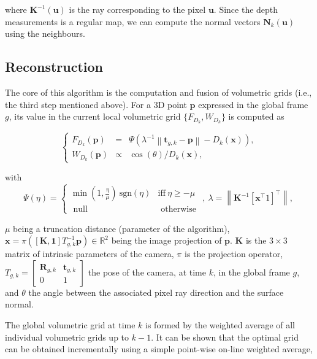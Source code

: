 where $\mathbf{K}^{-1}(\mathbf{u})$ is the ray corresponding to the pixel $\mathbf u$. Since the depth measurements is a regular map, we can compute the normal vectors $\mathbf{N}_k(\mathbf{u})$ using the neighbours.



\subsection{Reconstruction}
The core of this algorithm is the computation and fusion of volumetric grids (i.e., the third step mentioned above). For a 3D point $\mathbf{p}$ expressed in the global frame $g$, its value in the current local volumetric grid $\{F_{D_k},W_{D_k}\}$ is computed as

$$
\left\{
\begin{array}{ccc}
F_{D_{k}}(\mathbf{p}) &=& \Psi (\lambda^{-1} \left \| \mathbf{t}_{g,k} - \mathbf{p}\right \| - D_k(\mathbf{x})), \\
W_{D_{k}}(\mathbf{p}) &\propto& \cos(\theta)/D_{k}(\mathbf{x}),
\end{array}
\right.
$$

with
$$
\Psi (\eta) =
\left \{
\begin{array}{cc}
\min(1,\frac{\eta}{\mu}) ~\text{sgn}(\eta) & \text{iff} ~ \eta \geq -\mu \\
\mbox{ null } & \mbox{ otherwise }
\end{array}
\right. , ~
\lambda = \left \| \mathbf{K}^{-1} [\mathbf{x}^\top 1]^\top \right \|,~
$$

$\mu$ being a truncation distance (parameter of the algorithm), $\mathbf{x} = \pi([\mathbf{K},\mathbf 1] T^{-1}_{g,k} \mathbf{p}) \in \mathbb{R}^2$ being the image projection of $\mathbf p$. $\mathbf{K}$ is the $3\times 3$ matrix of intrinsic parameters of the camera, $\pi$ is the projection operator, $T_{g,k} = \left[ \begin{matrix} \mathbf{R}_{g,k} & \mathbf{t}_{g,k} \\ 0 & 1 \end{matrix} \right]$ the pose of the camera, at time $k$, in the global frame $g$, and $\theta$ the angle between the associated pixel ray direction and the surface normal.

The global volumetric grid at time $k$ is formed by the weighted average of all individual volumetric grids up to $k-1$. It can be shown that the optimal grid can be obtained incrementally using a simple point-wise on-line weighted average,

